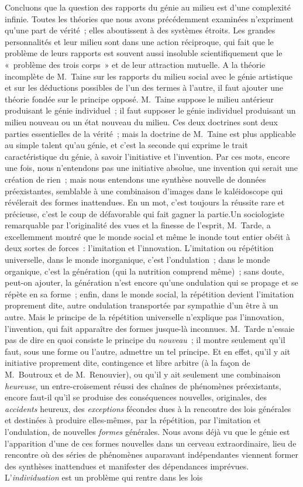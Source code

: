 \documentclass[french,twoside]{book} %
\begin{document}
Concluons que la question des rapports du génie au milieu est d’une complexité infinie. Toutes les théories que nous avons précédemment examinées n’expriment qu’une part de vérité ; elles aboutissent à des systèmes étroits. Les grandes personnalités et leur milieu sont dans une action réciproque, qui fait que le problème de leurs rapports est souvent aussi insoluble scientifiquement que le « problème des trois corps » et de leur attraction mutuelle. A la théorie incomplète de M. Taine sur les rapports du milieu social avec le génie artistique et sur les déductions possibles de l’un des termes à l’autre, il faut ajouter une théorie fondée sur le principe opposé. M. Taine suppose le milieu antérieur produisant le génie individuel ; il faut supposer le génie individuel produisant un milieu nouveau ou un état nouveau du milieu. Ces deux doctrines sont deux parties essentielles de la vérité ; mais la doctrine de M. Taine est plus applicable au simple talent qu’au génie, et c’est la seconde qui exprime le trait caractéristique du génie, à savoir l’initiative et l’invention. Par ces mots, encore une fois, nous n’entendons pas une initiative absolue, une invention qui serait une création de rien ; mais nous entendons une synthèse nouvelle de données préexistantes, semblable à une combinaison d’images dans le kaléidoscope qui révélerait des formes inattendues. En un mot, c’est toujours la réussite rare et précieuse, c’est le coup de défavorable qui fait gagner la partie.Un sociologiste remarquable par l’originalité des vues et la finesse de l’esprit, M. Tarde, a excellemment montré que le monde social et même le inonde tout entier obéit à deux sortes de forces : l’imitation et l’innovation. L’imitation ou répétition universelle, dans le monde inorganique, c’est l’ondulation ; dans le monde organique, c’est la génération (qui la nutrition comprend même) ; sans doute, peut-on ajouter, la génération n’est encore qu’une ondulation qui se propage et se répète en sa forme ; enfin, dans le monde social, la répétition devient l’imitation proprement dite, autre ondulation transportée par sympathie d’un être à un autre. Mais le principe de la répétition universelle n’explique pas l’innovation, l’invention, qui fait apparaître des formes jusque-là inconnues. M. Tarde n’essaie pas de dire en quoi consiste le principe du \emph{nouveau} ; il montre seulement qu’il faut, sous une forme ou l’autre, admettre un tel principe. Et en effet, qu’il y ait initiative proprement dite, contingence et libre arbitre (à la façon de M. Boutroux et de M. Renouvier), ou qu’il y ait seulement une combinaison \emph{heureuse}, un entre-croisement réussi des chaînes de phénomènes préexistants, encore faut-il qu’il se produise des conséquences nouvelles, originales, des \emph{accidents} heureux, des \emph{exceptions} fécondes dues à la rencontre des lois générales et destinées à produire elles-mêmes, par la répétition, par l’imitation et l’ondulation, de nouvelles \emph{formes} générales. Nous avons déjà vu que le génie est l’apparition d’une de ces formes nouvelles dans un cerveau extraordinaire, lieu de rencontre où des séries de phénomènes auparavant indépendantes viennent former des synthèses inattendues et manifester des dépendances imprévues. L’\emph{individuation} est un problème qui rentre dans les lois 
\end{document}
